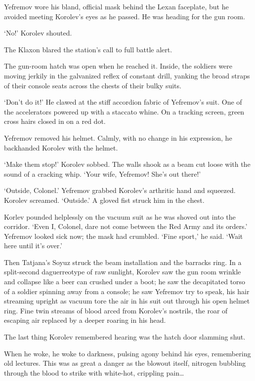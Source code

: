 Yefremov wore his bland, official mask behind the Lexan faceplate, but he avoided meeting Korolev’s eyes as he passed. He was heading for the gun room.

‘No!’ Korolev shouted.

The Klaxon blared the station’s call to full battle alert.

The gun-room hatch was open when he reached it. Inside, the soldiers were moving jerkily in the galvanized reflex of constant drill, yanking the broad straps of their console seats across the chests of their bulky suits.

‘Don’t do it!’ He clawed at the stiff accordion fabric of Yefremov’s suit. One of the accelerators powered up with a staccato whine. On a tracking screen, green cross hairs closed in on a red dot.

Yefremov removed his helmet. Calmly, with no change in his expression, he backhanded Korolev with the helmet.

‘Make them stop!’ Korolev sobbed. The walls shook as a beam cut loose with the sound of a cracking whip. ‘Your wife, Yefremov! She’s out there!’

‘Outside, Colonel.’ Yefremov grabbed Korolev’s arthritic hand and squeezed. Korolev screamed. ‘Outside.’ A gloved fist struck him in the chest.

Korlev pounded helplessly on the vacuum suit as he was shoved out into the corridor. ‘Even I, Colonel, dare not come between the Red Army and its orders.’ Yefremov looked sick now; the mask had crumbled. ‘Fine sport,’ he said. ‘Wait here until it’s over.’

Then Tatjana’s Soyuz struck the beam installation and the barracks ring. In a split-second daguerreotype of raw sunlight, Korolev saw the gun room wrinkle and collapse like a beer can crushed under a boot; he saw the decapitated torso of a soldier spinning away from a console; he saw Yefremov try to speak, his hair streaming upright as vacuum tore the air in his suit out through his open helmet ring. Fine twin streams of blood arced from Korolev’s nostrils, the roar of escaping air replaced by a deeper roaring in his head.

The last thing Korolev remembered hearing was the hatch door slamming shut.

When he woke, he woke to darkness, pulsing agony behind his eyes, remembering old lectures. This was as great a danger as the blowout itself, nitrogen bubbling through the blood to strike with white-hot, crippling pain…

